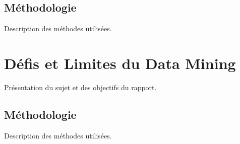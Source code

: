 \documentclass[a4paper,12pt]{report}
\begin{document}
\section{Méthodologie}
Description des méthodes utilisées.

\chapter{Défis et Limites du Data Mining}
Présentation du sujet et des objectifs du rapport.

\section{Méthodologie}
Description des méthodes utilisées.



\end{document}
